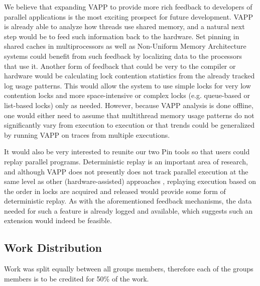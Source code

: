 We believe that expanding VAPP to provide more rich feedback to
developers of parallel applications is the most exciting prospect
for future development.  VAPP is already able to analyze how
threads use shared memory, and a natural next step would be to
feed such information back to the hardware.  Set pinning in
shared caches in multiprocessors as well as Non-Uniform Memory Architecture
systems could benefit from such feedback by localizing data
to the processors that use it.  Another form of feedback
that could be very to the compiler or hardware would be calculating
lock contention statistics from the already tracked log usage patterns.
This would allow the system to use simple locks for very low contention
locks and more space-intensive or complex locks (e.g. queue-based 
or list-based locks) only as needed.  However, because VAPP analysis
is done offline, one would either need to assume that multithread
memory usage patterns do not significantly vary from execution to
execution or that trends could be generalized by running VAPP on
traces from multiple executions.

It would also be very interested to reunite our two Pin tools
so that users could replay parallel programs.  Deterministic
replay is an important area of research, and although VAPP does not
presently does not track parallel execution at the same level as
other (hardware-assisted) approaches \cite{narayansamy2005bugnet},
replaying execution based on the order in locks are acquired and
released would provide some form of deterministic replay.  As with
the aforementioned feedback mechanisms, the data needed for such a
feature is already logged and available, which suggests such an
extension would indeed be feasible.

\subsection{Work Distribution}
Work was split equally between all groups members, therefore each of
the groups members is to be credited for 50\% of the work.
